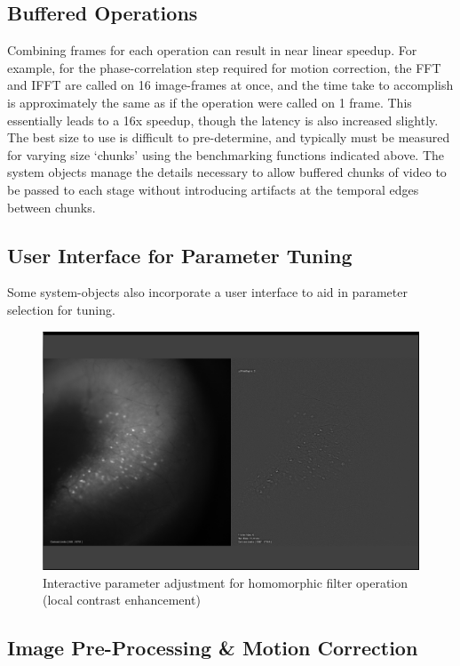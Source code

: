 \subsection{Buffered Operations}\label{sec:buffered-operations}

Combining frames for each operation can result in near linear speedup.
For example, for the phase-correlation step required for motion correction, the FFT and IFFT are called on 16 image-frames at once, and the time take to accomplish is approximately the same as if the operation were called on 1 frame.
This essentially leads to a 16x speedup, though the latency is also increased slightly.
The best size to use is difficult to pre-determine, and typically must be measured for varying size `chunks' using the benchmarking functions indicated above.
The system objects manage the details necessary to allow buffered chunks of video to be passed to each stage without introducing artifacts at the temporal edges between chunks.

\subsection{User Interface for Parameter Tuning}\label{sec:user-interface-for-parameter-tuning}

Some system-objects also incorporate a user interface to aid in parameter selection for tuning.

\begin{figure}[htb]\centering
	\includegraphics[width=12cm]{figures/screenshot_20150608180058.png}
	\caption{Interactive parameter adjustment for homomorphic filter operation (local contrast enhancement)}
\end{figure}

\subsection{Image Pre-Processing \& Motion Correction}\label{sec:image-pre-processing-motion-correction}

